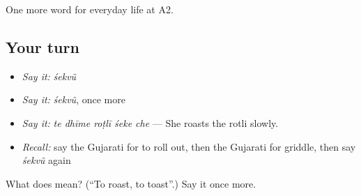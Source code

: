 \begin{grammarlens}[title={What you've built}]
One more word for everyday life at A2.
\end{grammarlens}

\subsection*{Your turn}
\begin{itemize}
\raggedright
  \item \emph{Say it:} \emph{śekvũ}
  \item \emph{Say it:} \emph{śekvũ}, once more
  \item \emph{Say it:} \emph{te dhīme roṭlī śeke che} — She roasts the rotli slowly.
  \item \emph{Recall:} say the Gujarati for to roll out, then the Gujarati for griddle, then say \emph{śekvũ} again
\end{itemize}

\begin{tcolorbox}[breakable,colback=teal!4,colframe=teal!35!black,title={Before you move on}]
What does  mean? (\textquotedblleft{}To roast, to toast\textquotedblright{}.) Say it once more.
\end{tcolorbox}
